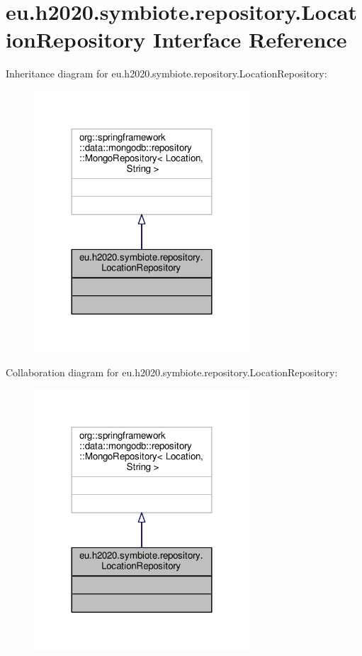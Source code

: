 \hypertarget{interfaceeu_1_1h2020_1_1symbiote_1_1repository_1_1LocationRepository}{}\section{eu.\+h2020.\+symbiote.\+repository.\+Location\+Repository Interface Reference}
\label{interfaceeu_1_1h2020_1_1symbiote_1_1repository_1_1LocationRepository}


Inheritance diagram for eu.\+h2020.\+symbiote.\+repository.\+Location\+Repository\+:
\nopagebreak
\begin{figure}[H]
\begin{center}
\leavevmode
\includegraphics[width=228pt]{interfaceeu_1_1h2020_1_1symbiote_1_1repository_1_1LocationRepository__inherit__graph}
\end{center}
\end{figure}


Collaboration diagram for eu.\+h2020.\+symbiote.\+repository.\+Location\+Repository\+:
\nopagebreak
\begin{figure}[H]
\begin{center}
\leavevmode
\includegraphics[width=228pt]{interfaceeu_1_1h2020_1_1symbiote_1_1repository_1_1LocationRepository__coll__graph}
\end{center}
\end{figure}


